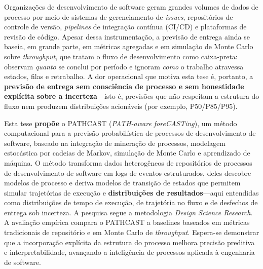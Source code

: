 \begin{resumo}
Organizações de desenvolvimento de software geram grandes volumes de dados
de processo por meio de sistemas de gerenciamento de \textit{issues},
repositórios de controle de versão, \textit{pipelines} de integração
contínua (CI/CD) e plataformas de revisão de código.
Apesar dessa instrumentação, a previsão de entrega ainda se baseia, em
grande parte, em métricas agregadas e em simulação de Monte Carlo sobre
\textit{throughput}, que tratam o fluxo de desenvolvimento como
caixa-preta: observam \emph{quanto} se conclui por período e ignoram
\emph{como} o trabalho atravessa estados, filas e retrabalho.
A dor operacional que motiva esta tese é, portanto, a
\textbf{previsão de entrega sem consciência de processo e sem honestidade
explícita sobre a incerteza}---isto é, previsões que não respeitam a
estrutura do fluxo nem produzem distribuições acionáveis
(por exemplo, P50/P85/P95).

Esta tese \textbf{propõe} o PATHCAST (\textit{PATH-aware foreCASTing}),
um método computacional para a previsão probabilística de processos de
desenvolvimento de software, baseado na integração de mineração de
processos, modelagem estocástica por cadeias de Markov, simulação de Monte
Carlo e aprendizado de máquina.
O método transforma dados heterogêneos de repositórios de processos de
desenvolvimento de software em logs de eventos estruturados, deles
descobre modelos de processo e deriva modelos de transição de estados que
permitem simular trajetórias de execução e
\textbf{distribuições de resultados}---aqui entendidas como distribuições
de tempo de execução, de trajetória no fluxo e de desfechos de entrega
sob incerteza.
A pesquisa segue a metodologia \textit{Design Science Research}.
A avaliação empírica compara o PATHCAST a baselines baseados em métricas
tradicionais de repositório e em Monte Carlo de \textit{throughput}.
Espera-se demonstrar que a incorporação explícita da estrutura do processo
melhora precisão preditiva e interpretabilidade, avançando a inteligência
de processos aplicada à engenharia de software.
\end{resumo}
